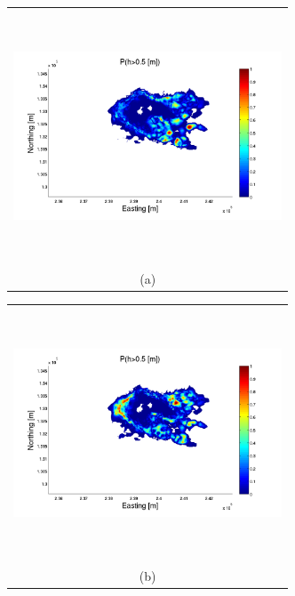 \documentclass[12pt]{article}
\newcommand{\Pic}[2][0.85]{\begin{center}\texttt{[image: \#2]}
 \end{center} }
\begin{document}
\begin{figure}[H]
      \begin{minipage}[b]{0.6\textwidth}
        \begin{tabular}{c}
       \includegraphics[width=8cm,height=7.5cm,keepaspectratio]{Galeras0_minus_Aster30.pdf}\\
        (a)
        \end{tabular}
    \end{minipage}
    \begin{minipage}{0.6\textwidth}
        \begin{tabular}{c}
	\includegraphics[width=8cm,height=7.5cm,keepaspectratio]{Galeras3_minus_Aster30.pdf}\\
        (b)
        \end{tabular}
    \end{minipage} 
    \begin{minipage}[b]{0.6\textwidth}
        \begin{tabular}{c}

\end{tabular}
\end{minipage}
\end{figure}
\end{document}
